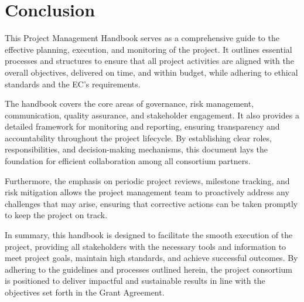 \documentclass[a4paper,12pt]{article}
\begin{document}
\newpage 

\section{\textcolor{EUblue}{Conclusion}} \label{sec:conclusion}

This Project Management Handbook serves as a comprehensive guide to the effective planning, execution, and monitoring of the project. It outlines essential processes and structures to ensure that all project activities are aligned with the overall objectives, delivered on time, and within budget, while adhering to ethical standards and the EC's requirements.

The handbook covers the core areas of governance, risk management, communication, quality assurance, and stakeholder engagement. It also provides a detailed framework for monitoring and reporting, ensuring transparency and accountability throughout the project lifecycle. By establishing clear roles, responsibilities, and decision-making mechanisms, this document lays the foundation for efficient collaboration among all consortium partners.

Furthermore, the emphasis on periodic project reviews, milestone tracking, and risk mitigation allows the project management team to proactively address any challenges that may arise, ensuring that corrective actions can be taken promptly to keep the project on track.

In summary, this handbook is designed to facilitate the smooth execution of the project, providing all stakeholders with the necessary tools and information to meet project goals, maintain high standards, and achieve successful outcomes. By adhering to the guidelines and processes outlined herein, the project consortium is positioned to deliver impactful and sustainable results in line with the objectives set forth in the Grant Agreement.



\label{MyLastPage}
\end{document}
